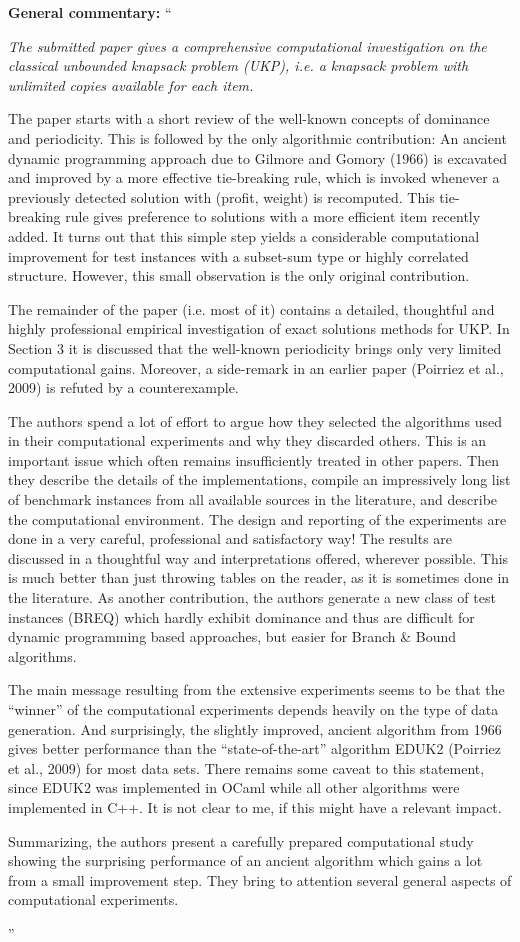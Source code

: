 \documentclass{elsarticle}
\begin{document}
\textbf{General commentary:} ``{\itshape
The submitted paper gives a comprehensive computational investigation on the classical unbounded knapsack problem (UKP), i.e. a knapsack problem with unlimited copies available for each item.

The paper starts with a short review of the well-known concepts of dominance and periodicity. This is followed by the only algorithmic contribution: An ancient dynamic programming approach due to Gilmore and Gomory (1966) is excavated and improved by a more effective tie-breaking rule, which is invoked whenever a previously detected solution with (profit, weight) is recomputed. This tie-breaking rule gives preference to solutions with a more efficient item recently added. It turns out that this simple step yields a considerable computational improvement for test instances with a subset-sum type or highly correlated structure. However, this small observation is the only original contribution.

The remainder of the paper (i.e. most of it) contains a detailed, thoughtful and highly professional empirical investigation of exact solutions methods for UKP. In Section 3 it is discussed that the well-known periodicity brings only very limited computational gains. Moreover, a side-remark in an earlier paper (Poirriez et al., 2009) is refuted by a counterexample.

The authors spend a lot of effort to argue how they selected the algorithms used in their computational experiments and why they discarded others. This is an important issue which often remains insufficiently treated in other papers. Then they describe the details of the implementations, compile an impressively long list of benchmark instances from all available sources in the literature, and describe the computational environment. The design and reporting of the experiments are done in a very careful, professional and satisfactory way! The results are discussed in a thoughtful way and interpretations offered, wherever possible. This is much better than just throwing tables on the reader, as it is sometimes done in the literature. As another contribution, the authors generate a new class of test instances (BREQ) which hardly exhibit dominance and thus are difficult for dynamic programming based approaches, but easier for Branch \& Bound algorithms.

The main message resulting from the extensive experiments seems to be that the ``winner'' of the computational experiments depends heavily on the type of data generation. And surprisingly, the slightly improved, ancient algorithm from 1966 gives better performance than the ``state-of-the-art'' algorithm EDUK2 (Poirriez et al., 2009) for most data sets. There remains some caveat to this statement, since EDUK2 was implemented in OCaml while all other algorithms were implemented in C++. It is not clear to me, if this might have a relevant impact.

Summarizing, the authors present a carefully prepared computational study showing the surprising performance of an ancient algorithm which gains a lot from a small improvement step. They bring to attention several general aspects of computational experiments.
}''
\end{document}
